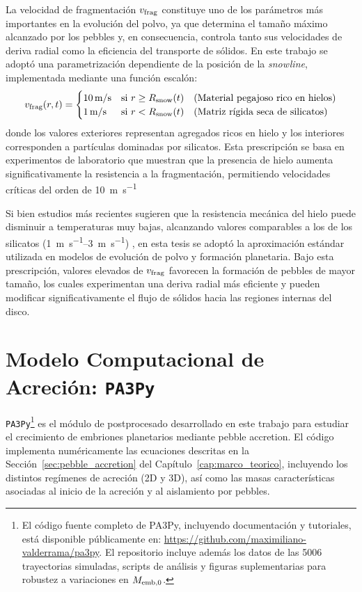 La velocidad de fragmentación $v_{\rm frag}$ constituye uno de los parámetros más importantes en la evolución del polvo, ya que determina el tamaño máximo alcanzado por los pebbles y, en consecuencia, controla tanto sus velocidades de deriva radial como la eficiencia del transporte de sólidos. En este trabajo se adoptó una parametrización dependiente de la posición de la \textit{snowline}, implementada mediante una función escalón:
\begin{equation} v_{\rm frag}(r,t) = \begin{cases} 10 \, \text{m/s} & \text{si } r \geq R_{\rm snow}(t) \quad \text{(Material pegajoso rico en hielos)} \\ 1 \, \text{m/s} & \text{si } r < R_{\rm snow}(t) \quad \text{(Matriz rígida seca de silicatos)} \end{cases} \end{equation}
donde los valores exteriores representan agregados ricos en hielo y los interiores corresponden a partículas dominadas por silicatos. Esta prescripción se basa en experimentos de laboratorio que muestran que la presencia de hielo aumenta significativamente la resistencia a la fragmentación, permitiendo velocidades críticas del orden de \SI{10}{\meter\per\second}

Si bien estudios más recientes sugieren que la resistencia mecánica del hielo puede disminuir a temperaturas muy bajas, alcanzando valores comparables a los de los silicatos
(\SIrange{1}{3}{\meter\per\second}) \citep{Musiolik_Grzegorz_Gerhard2019}, en esta tesis se adoptó la aproximación estándar utilizada en modelos de evolución de polvo y formación planetaria. Bajo esta prescripción, valores elevados de $v_{\rm frag}$ favorecen la formación de pebbles de mayor tamaño, los cuales experimentan una deriva radial más eficiente y pueden modificar significativamente el flujo de sólidos hacia las regiones internas del disco.


\section{Modelo Computacional de Acreción: \texttt{PA3Py}}
\label{sec: PA3Py}

\texttt{PA3Py}\footnote{El código fuente completo de PA3Py, incluyendo 
documentación y tutoriales, está disponible públicamente en: 
\url{https://github.com/maximiliano-valderrama/pa3py}. El repositorio 
incluye además los datos de las 5006 trayectorias simuladas, scripts 
de análisis y figuras suplementarias para robustez a variaciones en 
$M_{\rm emb,0}$.} es el módulo de postprocesado desarrollado en este trabajo para estudiar el crecimiento de embriones planetarios mediante pebble accretion. El código implementa numéricamente las ecuaciones descritas en la Sección~\ref{sec:pebble_accretion} del Capítulo~\ref{cap:marco_teorico}, incluyendo los distintos regímenes de acreción (2D y 3D), así como las masas características asociadas al inicio de la acreción y al aislamiento por pebbles.

